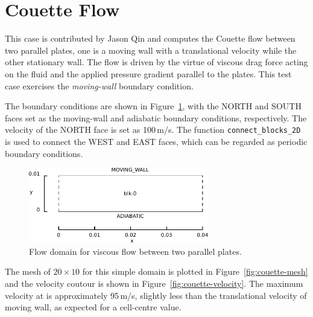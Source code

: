 
\newpage
\section{Couette Flow}
\label{couette-flow-2D}
%
This case is contributed by Jason Qin and computes the Couette flow between two parallel plates,
one is a moving wall with a translational velocity while the other stationary wall.
The flow is driven by the virtue of viscous drag force acting on the fluid and the applied
pressure gradient parallel to the plates.
This test case exercises the \emph{moving-wall} boundary condition.

\medskip
The boundary conditions are shown in Figure~\ref{couette-layout-fig}, 
with the NORTH and SOUTH faces set as the moving-wall and adiabatic boundary conditions, respectively.
The velocity of the NORTH face is set as 100\,m/s.
The function \verb!connect_blocks_2D! is used to connect the WEST and EAST faces, 
which can be regarded as periodic boundary conditions.

\begin{figure}[htbp]
\begin{center}
\includegraphics[width=0.7\textwidth]{../2D/couette-flow/couette.pdf}
\end{center}
\caption{Flow domain for viscous flow between two parallel plates.}
   \label{couette-layout-fig}
\end{figure}

\medskip
The mesh of $20 \times 10$ for this simple domain is plotted in Figure~\ref{fig:couette-mesh} 
and the velocity coutour is shown in Figure~\ref{fig:couette-velocity}.
The maximum velocity at is approximately 95\,m/s, 
slightly less than the translational velocity of moving wall, 
as expected for a cell-centre value.

